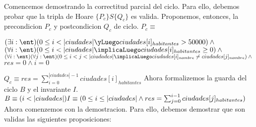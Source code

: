 \documentclass[10pt,a4paper]{article}
\begin{document}
Comencemos demostrando la correctitud parcial del ciclo. Para ello, debemos probar que la tripla de Hoare $\{P_c\}S\{Q_c\}$ es valida. Proponemos, entonces, la precondicion $P_c$ y postcondicion $Q_c$ de ciclo.
\newline \newline
$P_c \equiv$
\begin{adjustwidth}{2em}{}
	$(\exists i : \ent)(0 \leq i < |ciudades| \yLuego ciudades[i]_{habitantes} > 50000) \wedge  \newline$
	$(\forall i : \ent)(0 \leq i < |ciudades| \implicaLuego ciudades[i]_{habitantes} \geq 0 ) \wedge \newline$
	$(\forall i : \ent)(\forall j : \ent) (0 \leq i < j < |ciudades| \implicaLuego ciudades[i]_{nombre} \neq ciudades[j]_{nombre}) \wedge \newline$
	$res = 0 \wedge i = 0 $
\end{adjustwidth}
$Q_c \equiv res = \sum_{i=0}^{|ciudades|-1} ciudades[i]_{habitantes}$
\newline \newline
Ahora formalizemos la guarda del ciclo $B$ y el invariante $I$.
\newline \newline
$
	B \equiv (i < |ciudades|) \newline
	I \equiv (0 \leq i \leq |ciudades| \wedge res = \sum_{j=0}^{i-1}ciudades[j]_{habitantes})
$
\newline \newline
Ahora comenzemos con la demostracion. Para ello, debemos demostrar que son validas las siguientes proposiciones:

\end{document}
